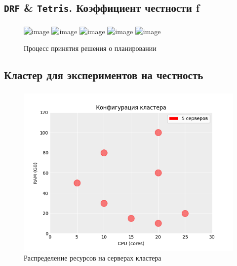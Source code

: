 \documentclass[t]{beamer}  %
\begin{document}
\subsection{\texttt{DRF} \& \texttt{Tetris}. Коэффициент честности f} 

\begin{frame}[fragile]
	\frametitle{\insertsection} 
	\framesubtitle{\insertsubsection}

	\begin{figure}[H]
		\centering
		\includegraphics<1>[width=0.8\linewidth]{images/tetris_pipeline_0} 
		\includegraphics<2>[width=0.8\linewidth]{images/tetris_pipeline_1} 
		\includegraphics<3>[width=0.8\linewidth]{images/tetris_pipeline_2} 
		\includegraphics<4>[width=0.8\linewidth]{images/tetris_pipeline_3} 
		\includegraphics<5>[width=0.8\linewidth]{images/tetris_pipeline_4} 
		\caption*{Процесс принятия решения о планировании}
	\end{figure}


\end{frame}

\subsection{Кластер для экспериментов на честность}

\begin{frame}[fragile]
	\frametitle{\insertsection} 
	\framesubtitle{\insertsubsection}

	\vspace{-0.5cm}
	
\begin{figure}[H]
    \centering 
    \includegraphics[width=0.8\linewidth]{images/hosts_distribution}
    \caption*{Распределение ресурсов на серверах кластера}
\end{figure}


\end{frame}
\end{document}
